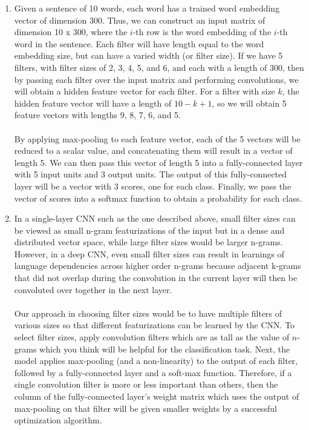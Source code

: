 \documentclass[a4paper]{article}
\begin{document}
\begin{enumerate}

\item{
Given a sentence of 10 words, each word has a trained word embedding vector of dimension 300. Thus, we can construct an input matrix of dimension 10 x 300, where the $i$-th row is the word embedding of the $i$-th word in the sentence. Each filter will have length equal to the word embedding size, but can have a varied width (or filter size). If we have 5 filters, with filter sizes of 2, 3, 4, 5, and 6, and each with a length of 300, then by passing each filter over the input matrix and performing convolutions, we will obtain a hidden feature vector for each filter. For a filter with size $k$, the hidden feature vector will have a length of $10-k+1$, so we will obtain 5 feature vectors with lengths 9, 8, 7, 6, and 5. 
\\\\By applying max-pooling to each feature vector, each of the 5 vectors will be reduced to a scalar value, and concatenating them will result in a vector of length 5. We can then pass this vector of length 5 into a fully-connected layer with 5 input units and 3 output units. The output of this fully-connected layer will be a vector with 3 scores, one for each class. Finally, we pass the vector of scores into a softmax function to obtain a probability for each class. 
}

\item{
In a single-layer CNN such as the one described above, small filter sizes can be viewed as small n-gram featurizations of the input but in a dense and distributed vector space, while large filter sizes would be larger n-grams. However, in a deep CNN, even small filter sizes can result in learnings of language dependencies across higher order n-grams because adjacent k-grams that did not overlap during the convolution in the current layer will then be convoluted over together in the next layer. 
\\\\
Our approach in choosing filter sizes would be to have multiple filters of various sizes so that different featurizations can be learned by the CNN. To select filter sizes, apply convolution filters which are as tall as the value of $n$-grams which you think will be helpful for the classification task. Next, the model applies max-pooling (and a non-linearity) to the output of each filter, followed by a fully-connected layer and a soft-max function. Therefore, if a single convolution filter is more or less important than others, then the column of the fully-connected layer's weight matrix which uses the output of max-pooling on that filter will be given smaller weights by a successful optimization algorithm.
}
\end{enumerate}
\end{document}
